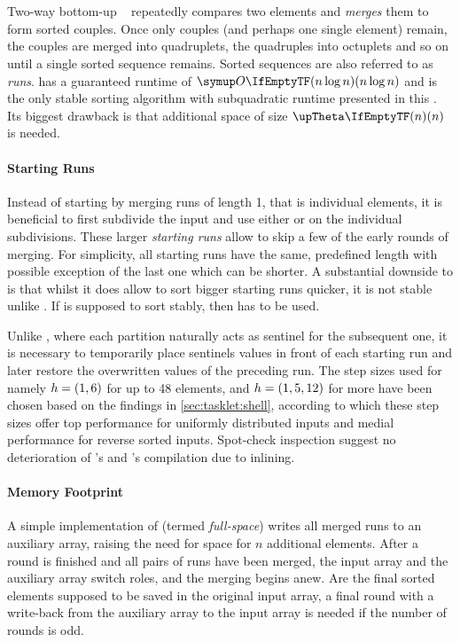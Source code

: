 \section{\texorpdfstring{\MS{}}{MergeSort}}
\label{sec:tasklet:merge}

Two-way bottom-up \MS{}~\cites{katajainen1997meticulous}[85\psq]{maurer1974datenstrukturen}[Chapter~2.3.1]{wirth1975algorithmen} repeatedly compares two elements and \emph{merges} them to form sorted couples.
Once only couples (and perhaps one single element) remain, the couples are merged into quadruplets, the quadruples into octuplets and so on until a single sorted sequence remains.
Sorted sequences are also referred to as \emph{runs}.
\MS{} has a guaranteed runtime of \(\bigoh{n \log n}\) and is the only stable sorting algorithm with subquadratic runtime presented in this .
Its biggest drawback is that additional space of size \(\bigtheta{n}\) is needed.


\paragraph{Starting Runs}
Instead of starting by merging runs of length 1, that is individual elements, it is beneficial to first subdivide the input and use either \IS{} or \ShS{} on the individual subdivisions.
These larger \emph{starting runs} allow to skip a few of the early rounds of merging.
For simplicity, all starting runs have the same, predefined length with possible exception of the last one which can be shorter.
A substantial downside to \ShS{} is that whilst it does allow to sort bigger starting runs quicker, it is not stable unlike \IS{}.
If \MS{} is supposed to sort stably, then \IS{} has to be used.

Unlike \QS{}, where each partition naturally acts as sentinel for the subsequent one, it is necessary to temporarily place sentinels values in front of each starting run and later restore the overwritten values of the preceding run.
The step sizes used for \ShS{} \Dash namely \(h = (1, 6)\) for up to 48 elements, and \(h = (1, 5, 12)\) for more \Dash have been chosen based on the findings in \cref{sec:tasklet:shell}, according to which these step sizes offer top performance for uniformly distributed inputs and medial performance for reverse sorted inputs.
Spot-check inspection suggest no deterioration of \IS{}'s and \ShS{}'s compilation due to inlining.


\paragraph{Memory Footprint}
A simple implementation of \MS{} (termed \emph{full-space}) writes all merged runs to an auxiliary array, raising the need for space for \(n\) additional elements.
After a round is finished and all pairs of runs have been merged, the input array and the auxiliary array switch roles, and the merging begins anew.
Are the final sorted elements supposed to be saved in the original input array, a final round with a write-back from the auxiliary array to the input array is needed if the number of rounds is odd.

